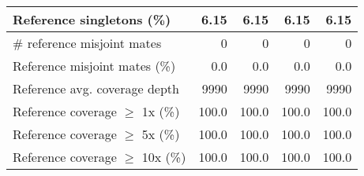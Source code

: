 \documentclass[12pt,a4paper]{article}
\begin{document}
\begin{table}[ht]
\begin{center}
\begin{tabular}{|l*{4}{|r}|}
Reference singletons (\%) & 6.15 & 6.15 & 6.15 & 6.15 \\ \hline
\# reference misjoint mates & 0 & 0 & 0 & 0 \\ \hline
Reference misjoint mates (\%) & 0.0 & 0.0 & 0.0 & 0.0 \\ \hline
Reference avg. coverage depth & 9990 & 9990 & 9990 & 9990 \\ \hline
Reference coverage $\geq$ 1x (\%) & 100.0 & 100.0 & 100.0 & 100.0 \\ \hline
Reference coverage $\geq$ 5x (\%) & 100.0 & 100.0 & 100.0 & 100.0 \\ \hline
Reference coverage $\geq$ 10x (\%) & 100.0 & 100.0 & 100.0 & 100.0 \\ \hline
\end{tabular}
\end{center}
\end{table}
\end{document}
